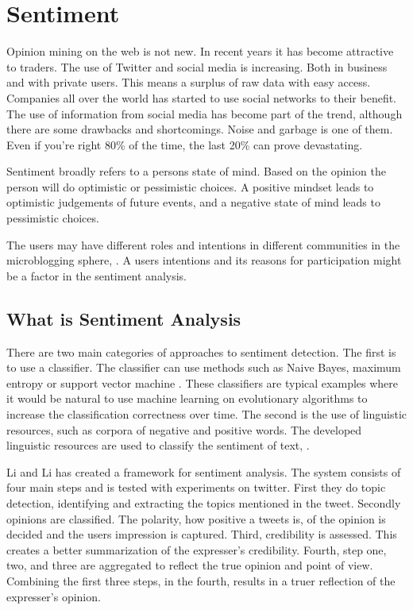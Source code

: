 \section{Sentiment}\label{previous_work:sentiment}

Opinion mining on the web is not new. In recent years it has
become attractive to traders. 
The use of Twitter and social media is increasing. Both in
business and with private users.
This means a surplus of raw data with
easy access. Companies all over the world has started to use social
networks to their benefit. The use of information from social media has become
part of the trend, although there are some drawbacks and shortcomings. Noise and
garbage is one of them. Even if you're right 80\% of the time, the last 20\% can
prove devastating. \cite[]{stevenson12:social_media_stock_pickers}

Sentiment broadly refers to a persons state of mind. Based on the opinion the
person will do optimistic or pessimistic choices. A positive mindset leads to
optimistic judgements of future events, and a negative state of mind leads to
pessimistic choices.
\cite[p4]{doukas10:sentiment_and_momentum}

The users may have different roles and intentions in different
communities in the microblogging sphere, \cite[]{java07}. 
A users intentions and its reasons for participation might be a factor in the sentiment analysis.

\subsection{What is Sentiment Analysis}
There are two main categories of approaches to sentiment detection. The first is
to use a classifier. The classifier can use methods such as Naive Bayes, maximum
entropy or support vector machine \cite[]{Li2013206}. These classifiers are
typical examples where it would be natural to use machine learning on
evolutionary algorithms to increase the classification correctness over time.
The second is the use of linguistic resources, such as corpora of negative and
positive words. The developed linguistic resources are used to classify the
sentiment of text, \cite[]{Li2013206}.

Li and Li has created a framework for sentiment analysis. The system
consists of four main steps  and is tested with experiments on twitter. 
	First they do topic detection, identifying and extracting the topics
mentioned in the tweet. 
	Secondly opinions are classified. The polarity, how positive a tweets is, of the opinion is decided and
the users impression is captured. 	
	Third, credibility is assessed. This creates a better summarization of the
expresser's credibility. 
	Fourth, step one, two, and three are aggregated to reflect the true opinion
and point of view.
	Combining the first three steps, in the fourth, results in a truer
reflection of the expresser's opinion. \cite[]{Li2013206} 

